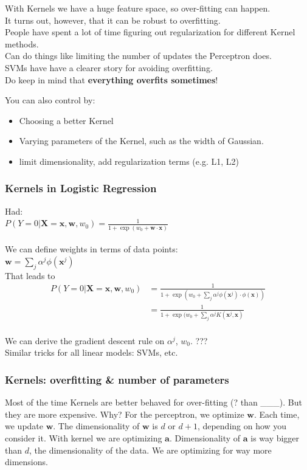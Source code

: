 With Kernels we have a huge feature space, so over-fitting can happen. \hfill \\
It turns out, however, that it can be robust to overfitting. \hfill \\
People have spent a lot of time figuring out regularization for different Kernel methods. \hfill \\
Can do things like limiting the number of updates the Perceptron does. \hfill \\
SVMs have have a clearer story for avoiding overfitting.  \hfill \\

Do keep in mind that \textbf{everything overfits sometimes}!

You can also control by:
\begin{itemize}
	\item Choosing a better Kernel
	\item Varying parameters of the Kernel, such as the width of Gaussian.
	\item  limit dimensionality, add regularization terms (e.g. L1, L2)
\end{itemize}

\subsubsection{Kernels in Logistic Regression}
Had: \hfill \\
$P(Y=0 | \bm{X}= \bm{x}, \bm{w}, w_0 )= \frac{1}{1 + \exp(w_0 + \bm{w}\cdot \bm{x})}$ \hfill \\
 \hfill \\

We can define weights in terms of data points: \hfill \\
$\displaystyle  \bm{w} = \sum_j \alpha^j \phi(\bm{x}^j)$  \hfill \\
That leads to 
\begin{align*}
	P(Y=0 | \bm{X}= \bm{x}, \bm{w}, w_0 ) &= \frac{1}{1 + \exp(w_0 +  \sum_j  \alpha^j \phi(\bm{x}^j) \cdot \phi(\bm{x}))} \\
		& = \frac{1}{1 + \exp(w_0 +  \sum_j  \alpha^j K(\bm{x}^j , \bm{x})} \\
\end{align*}

We can derive the gradient descent rule on $\alpha^j$, $w_0$.  ???  \hfill \\

Similar tricks for all linear models: SVMs, etc. 

\subsubsection{Kernels: overfitting \& number of parameters}
Most of the time Kernels are better behaved for over-fitting (? than \_\_\_).  But they are more expensive. 
Why? 
For the perceptron, we optimize $\bm{w}$.  Each time, we update $\bm{w}$.  
        The dimensionality of $\bm{w}$ is $d$ or $d+1$, depending on how you consider it. 
    With kernel we are optimizing $\bm{a}$. 
        Dimensionality of $\bm{a}$ is way bigger than $d$, the dimensionality of the data. 
    We are optimizing for way more dimensions.  \hfill \\
    
